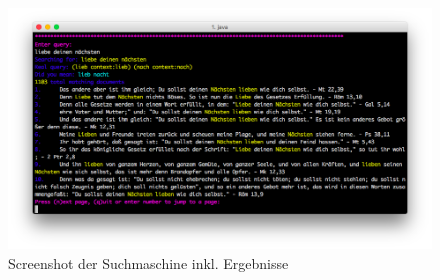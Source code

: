 \vfill
\begin{figure}[H]
	\centering
	\includegraphics[width=1.0\textwidth]{images/3-realization/searching_screenshot.png}
	\caption{Screenshot der Suchmaschine inkl. Ergebnisse}
\end{figure}

